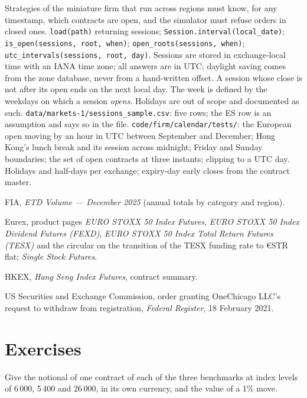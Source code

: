 \begin{build}
 Strategies of the miniature firm that run across regions
must know, for any timestamp, which contracts are open, and the simulator
must refuse orders in closed ones.
 \texttt{load(path)} returning sessions;
\texttt{Session.interval(local\_date)}; \texttt{is\_open(sessions, root,
when)}; \texttt{open\_roots(sessions, when)}; \texttt{utc\_intervals(sessions,
root, day)}.
 Sessions are stored in exchange-local time with an IANA time
zone; all answers are in UTC; daylight saving comes from the zone database,
never from a hand-written offset. A session whose close is not after its
open ends on the next local day. The week is defined by the weekdays on which
a session \emph{opens}. Holidays are out of scope and documented as such.
 \texttt{data/markets-1/sessions\_sample.csv}: five rows; the
ES row is an assumption and says so in the file.
 \texttt{code/firm/calendar/tests/}: the European
open moving by an hour in UTC between September and December; Hong Kong's
lunch break and its session across midnight; Friday and Sunday boundaries;
the set of open contracts at three instants; clipping to a UTC day.
 Holidays and half-days per exchange; expiry-day early
closes from the contract master.
\end{build}

\begin{omsources}
\item FIA, \emph{ETD Volume --- December 2025} (annual totals by category and
region).
\item Eurex, product pages \emph{EURO STOXX 50 Index Futures}, \emph{EURO
STOXX 50 Index Dividend Futures (FEXD)}, \emph{EURO STOXX 50 Index Total
Return Futures (TESX)} and the circular on the transition of the TESX funding
rate to \euro STR flat; \emph{Single Stock Futures}.
\item HKEX, \emph{Hang Seng Index Futures}, contract summary.
\item US Securities and Exchange Commission, order granting OneChicago LLC's
request to withdraw from registration, \emph{Federal Register}, 18 February
2021.
\end{omsources}

\section{Exercises}

\begin{exercise}[$\star$]\label{exo:m1:index-and-single-stock-futures-worldwide:1}
Give the notional of one contract of each of the three benchmarks at index
levels of 6\,000, 5\,400 and 26\,000, in its own currency, and the value of a
1\% move.
\end{exercise}

